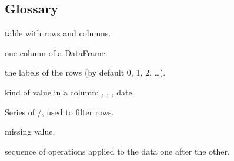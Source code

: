 \documentclass[11pt,a4paper]{article}
\begin{document}
\subsection*{Glossary}

\begin{description}[leftmargin=2.6cm, labelwidth=2.4cm, font=\normalfont\bfseries]
  \item[DataFrame] table with rows and columns.
  \item[Series] one column of a DataFrame.
  \item[index] the labels of the rows (by default 0, 1, 2, \dots).
  \item[data type] kind of value in a column: , , , date.
  \item[mask] Series of /, used to filter rows.
  \item[NaN] missing value.
  \item[pipeline] sequence of operations applied to the data one after the other.
\end{description}
\end{document}
